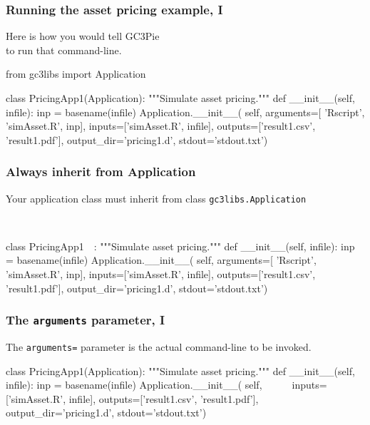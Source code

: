 \documentclass[english,serif,mathserif,xcolor=pdftex,dvipsnames,table]{beamer}
\begin{document}
\begin{frame}[fragile]
\frametitle{Running the asset pricing example, I}

  Here is how you would tell GC3Pie \\ to run that command-line.

\begin{python}
from gc3libs import Application

class PricingApp1(Application):
  """Simulate asset pricing."""
  def __init__(self, infile):
    inp = basename(infile)
    Application.__init__(
      self,
      arguments=[
        'Rscript', 'simAsset.R', inp],
      inputs=['simAsset.R', infile],
      outputs=['result1.csv', 'result1.pdf'],
      output_dir='pricing1.d',
      stdout='stdout.txt')
\end{python}
\end{frame}


\begin{frame}[fragile]
\frametitle{Always inherit from Application}

  Your application class must inherit from class \texttt{gc3libs.Application}
  \+
\begin{python}
~~

class PricingApp1~~:
  """Simulate asset pricing."""
  def __init__(self, infile):
    inp = basename(infile)
    Application.__init__(
      self,
      arguments=[
        'Rscript', 'simAsset.R', inp],
      inputs=['simAsset.R', infile],
      outputs=['result1.csv', 'result1.pdf'],
      output_dir='pricing1.d',
      stdout='stdout.txt')
\end{python}
\end{frame}


\begin{frame}[fragile]
  \frametitle{The \texttt{arguments} parameter, I}

  The \texttt{arguments=} parameter is the actual command-line to be invoked.

  \+
\begin{python}
class PricingApp1(Application):
  """Simulate asset pricing."""
  def __init__(self, infile):
    inp = basename(infile)
    Application.__init__(
      self,
      ~\HL{arguments=[}~
        ~\HL{"Rscript", "simAsset.R", inp],}~
      inputs=['simAsset.R', infile],
      outputs=['result1.csv', 'result1.pdf'],
      output_dir='pricing1.d',
      stdout='stdout.txt')
\end{python}
\end{frame}
\end{document}
